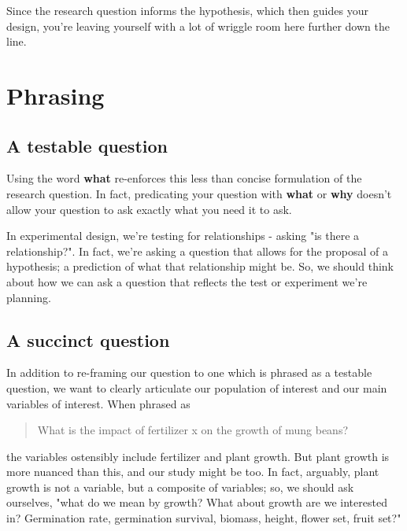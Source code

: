 \documentclass[
]{book}
\begin{document}
Since the research question informs the hypothesis, which then guides your design, you're leaving yourself with a lot of wriggle room here further down the line.

\hypertarget{phrasing}{%
\section*{Phrasing}\label{phrasing}}

\hypertarget{a-testable-question}{%
\subsection*{A testable question}\label{a-testable-question}}

Using the word \textbf{what} re-enforces this less than concise formulation of the research question. In fact, predicating your question with \textbf{what} or \textbf{why} doesn't allow your question to ask exactly what you need it to ask.

In experimental design, we're testing for relationships - asking "is there a relationship?". In fact, we're asking a question that allows for the proposal of a hypothesis; a prediction of what that relationship might be. So, we should think about how we can ask a question that reflects the test or experiment we're planning.

\hypertarget{a-succinct-question}{%
\subsection*{A succinct question}\label{a-succinct-question}}

In addition to re-framing our question to one which is phrased as a testable question, we want to clearly articulate our population of interest and our main variables of interest. When phrased as

\begin{quote}
What is the impact of fertilizer x on the growth of mung beans?
\end{quote}

the variables ostensibly include fertilizer and plant growth. But plant growth is more nuanced than this, and our study might be too. In fact, arguably, plant growth is not a variable, but a composite of variables; so, we should ask ourselves, "what do we mean by growth? What about growth are we interested in? Germination rate, germination survival, biomass, height, flower set, fruit set?"
\end{document}
